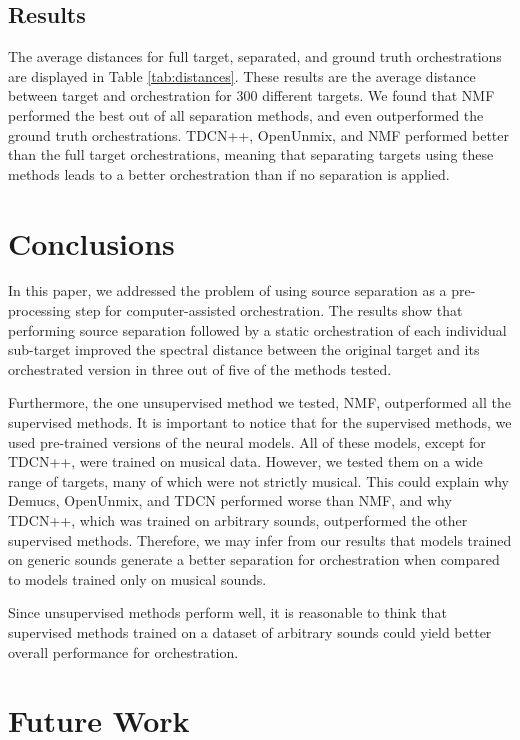 \documentclass{article}
\begin{document}
		\subsection{Results}
		The average distances for full target, separated, and ground truth orchestrations are displayed in Table \ref{tab:distances}. These results are the average distance between target and orchestration for 300 different targets. We found that NMF performed the best out of all separation methods, and even outperformed the ground truth orchestrations. TDCN++, OpenUnmix, and NMF performed better than the full target orchestrations, meaning that separating targets using these methods leads to a better orchestration than if no separation is applied.
	
	\section{Conclusions}\label{sec:conclusions}
	In this paper, we addressed the problem of using source separation as a pre-processing step for computer-assisted orchestration. The results show that performing source separation followed by a static orchestration of each individual sub-target improved the spectral distance between the original target and its orchestrated version in three out of five of the methods tested.
	
	Furthermore, the one unsupervised method we tested, NMF, outperformed all the supervised methods. It is important to notice that for the supervised methods, we used pre-trained versions of the neural models. All of these models, except for TDCN++, were trained on musical data. However, we tested them on a wide range of targets, many of which were not strictly musical. This could explain why Demucs, OpenUnmix, and TDCN performed worse than NMF, and why TDCN++, which was trained on arbitrary sounds, outperformed the other supervised methods. Therefore, we may infer from our results that models trained on generic sounds generate a better separation for orchestration when compared to models trained only on musical sounds.
	
	Since unsupervised methods perform well, it is reasonable to think that supervised methods trained on a dataset of arbitrary sounds could yield better overall performance for orchestration.
	
	\section{Future Work}\label{sec:futurework}
\end{document}
